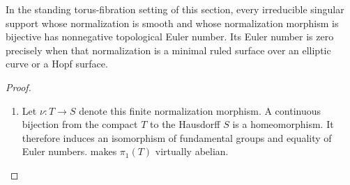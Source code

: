 \begin{proposition}\hypertarget{tag-02YD}{}\label{night:P4R.2}\label{stmt:P4R.2}

In the standing torus-fibration setting of this section, every irreducible singular support
whose normalization is smooth and whose normalization morphism
is bijective has nonnegative topological Euler number.
Its Euler number is zero precisely when that normalization is
a minimal ruled surface over an elliptic curve or a Hopf surface.
\end{proposition}
\begin{proof}

\begin{enumerate}[label=\arabic*.,leftmargin=*]
\item Let $\nu:T\to S$ denote this finite normalization morphism.
A continuous bijection from the compact $T$ to the Hausdorff
$S$ is a homeomorphism. It therefore induces an isomorphism
of fundamental groups and equality of Euler numbers.
 makes $\pi_1(T)$ virtually abelian.


\end{enumerate}
\end{proof}
